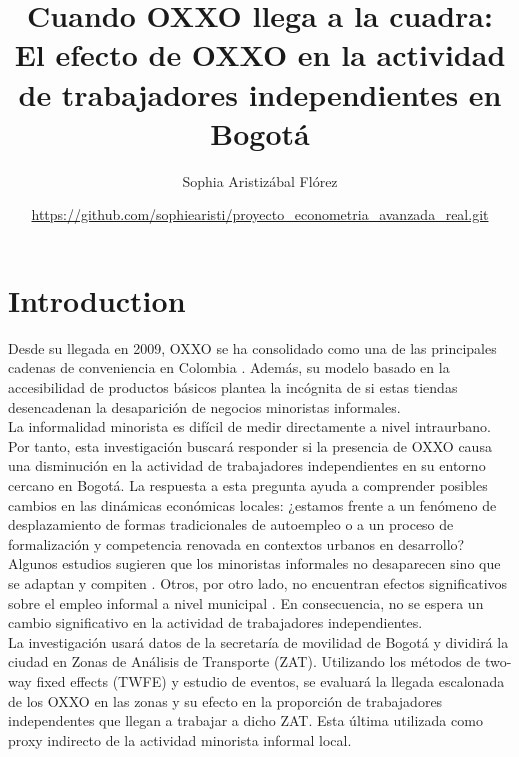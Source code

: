 \documentclass{article}
\title{Cuando OXXO llega a la cuadra: El efecto de OXXO en la actividad de trabajadores independientes en Bogotá}
\author{Sophia Aristizábal Flórez}
\date{\small{\url{https://github.com/sophiearisti/proyecto_econometria_avanzada_real.git}}}
\begin{document}
\maketitle
\onehalfspacing

\section{Introduction}

Desde su llegada en 2009, OXXO se ha consolidado como una de las principales cadenas de conveniencia en Colombia \parencite{m_2025}. 
Además, su modelo basado en la accesibilidad de productos básicos plantea la incógnita de si estas tiendas desencadenan la desaparición de negocios minoristas informales. \\


La informalidad minorista es difícil de medir directamente a nivel intraurbano. Por tanto, esta investigación buscará responder si la presencia de OXXO causa una disminución en la actividad de trabajadores independientes en su entorno cercano en Bogotá. La respuesta a esta pregunta ayuda a comprender posibles cambios en las dinámicas económicas locales: ¿estamos frente a un fenómeno de desplazamiento de formas tradicionales de autoempleo o a un proceso de formalización y competencia renovada en contextos urbanos en desarrollo? \\

Algunos estudios sugieren que los minoristas informales no desaparecen sino que se adaptan y compiten \parencite{marcos2022}. Otros, por otro lado, no encuentran efectos significativos sobre el empleo informal a nivel municipal \parencite{delgado2024}. En consecuencia, no se espera un cambio significativo en la actividad de trabajadores independientes. \\

La investigación usará datos de la secretaría de movilidad de Bogotá y dividirá la ciudad en Zonas de Análisis de Transporte (ZAT).  Utilizando los métodos de two-way fixed effects (TWFE) y estudio de eventos, se evaluará la llegada escalonada de los OXXO en las zonas y su efecto en la proporción de trabajadores independentes que llegan a trabajar a dicho ZAT. Esta última utilizada como proxy indirecto de la actividad minorista informal local. \\

\end{document}
